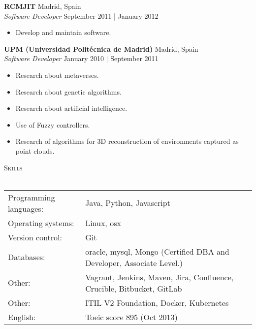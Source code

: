 \documentclass[a4paper]{article}
\newcommand{\lineunder} {
    \vspace*{-8pt} \\
    \hspace*{-18pt} \hrulefill \\
}
\newcommand{\header} [1] {
    {\hspace*{-18pt}\vspace*{6pt} \textsc{#1}}
    \vspace*{-6pt} \lineunder
}
\begin{document}
\textbf{RCMJIT} \hfill Madrid, Spain\\
\textit{Software Developer} \hfill September 2011 | January 2012\\
\vspace{-1mm}
\begin{itemize} \itemsep 1pt
	\item Develop and maintain software.
\end{itemize}

\textbf{UPM (Universidad Politécnica de Madrid)} \hfill Madrid, Spain\\
\textit{Software Developer} \hfill January 2010 | September 2011\\
\vspace{-1mm}
\begin{itemize} \itemsep 1pt
	\item Research about metaverses.
	\item Research about genetic algorithms.
	\item Research about artificial intelligence.
	\item Use of Fuzzy controllers.
	\item Research of algorithms for 3D reconstruction of environments captured as point clouds.
\end{itemize}

\header{Skills}
\begin{tabular}{ l l }
	Programming languages: & Java, Python, Javascript                                                  \\
	Operating systems:     & Linux, osx                                                                \\
	Version control:       & Git                                                                       \\
	Databases:             & oracle, mysql, Mongo (Certified DBA and Developer, Associate Level.)      \\
	Other:                 & Vagrant, Jenkins, Maven, Jira, Confluence, Crucible, Bitbucket, GitLab    \\
	Other:                 & ITIL V2 Foundation, Docker, Kubernetes                                    \\
	English:               & Toeic score 895 (Oct 2013)                                                \\
\end{tabular}

\vspace*{2mm}
\end{document}
